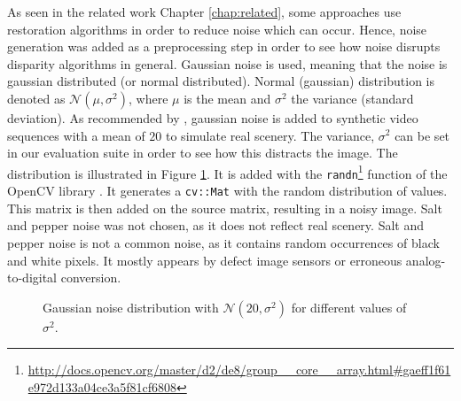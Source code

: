 As seen in the related work Chapter \ref{chap:related}, some approaches use restoration algorithms in order to reduce noise which can occur.
Hence, noise generation was added as a preprocessing step in order to see how noise disrupts disparity algorithms in general.
Gaussian noise is used, meaning that the noise is gaussian distributed (or normal distributed).
Normal (gaussian) distribution is denoted as $\mathcal{N}(\mu,\sigma^2)$, where $\mu$ is the mean and $\sigma^2$ the variance (standard deviation).
\newline\newline\noindent As recommended by \citep{richardt2010real}, gaussian noise is added to synthetic video sequences with a mean of $20$ to simulate real scenery.
The variance, $\sigma^2$ can be set in our evaluation suite in order to see how this distracts the image.
The distribution is illustrated in Figure \ref{fig:gaussian}.
\newline\newline\noindent It is added with the \texttt{randn}\footnote{\url{http://docs.opencv.org/master/d2/de8/group__core__array.html\#gaeff1f61e972d133a04ce3a5f81cf6808}} function of the OpenCV library \citep{opencv_library}.
It generates a \texttt{cv::Mat} with the random distribution of values.
This matrix is then added on the source matrix, resulting in a noisy image.
Salt and pepper noise was not chosen, as it does not reflect real scenery.
Salt and pepper noise is not a common noise, as it contains random occurrences of black and white pixels.
It mostly appears by defect image sensors or erroneous analog-to-digital conversion.

\begin{figure}[h!]
  \vspace{1cm}
  \centering
  \caption{Gaussian noise distribution with $\mathcal{N}(20,\sigma^2)$ for different values of $\sigma^2$.}
  \label{fig:gaussian}
\end{figure}

